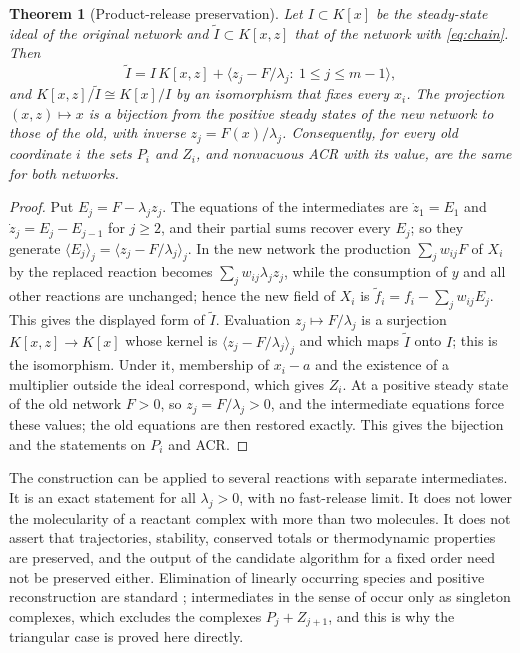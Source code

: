 \documentclass[11pt,a4paper]{article}
\theoremstyle{plain}
\newtheorem{theorem}{Theorem}[section]
\theoremstyle{definition}
\theoremstyle{remark}
\begin{document}
\begin{theorem}[Product-release preservation]\label{thm:release}
Let $I\subset K[x]$ be the steady-state ideal of the original network and $\tilde I\subset K[x,z]$ that of the network with \eqref{eq:chain}. Then
\[
  \tilde I=I\,K[x,z]+\bigl\langle z_j-F/\lambda_j:\ 1\le j\le m-1\bigr\rangle ,
\]
and $K[x,z]/\tilde I\cong K[x]/I$ by an isomorphism that fixes every $x_i$. The projection $(x,z)\mapsto x$ is a bijection from the positive steady states of the new network to those of the old, with inverse $z_j=F(x)/\lambda_j$. Consequently, for every old coordinate $i$ the sets $P_i$ and $Z_i$, and nonvacuous ACR with its value, are the same for both networks.
\end{theorem}
\begin{proof}
Put $E_j=F-\lambda_jz_j$. The equations of the intermediates are $\dot z_1=E_1$ and $\dot z_j=E_j-E_{j-1}$ for $j\ge2$, and their partial sums recover every $E_j$; so they generate $\langle E_j\rangle_j=\langle z_j-F/\lambda_j\rangle_j$. In the new network the production $\sum_jw_{ij}F$ of $X_i$ by the replaced reaction becomes $\sum_jw_{ij}\lambda_jz_j$, while the consumption of $y$ and all other reactions are unchanged; hence the new field of $X_i$ is $\tilde f_i=f_i-\sum_jw_{ij}E_j$. This gives the displayed form of $\tilde I$. Evaluation $z_j\mapsto F/\lambda_j$ is a surjection $K[x,z]\to K[x]$ whose kernel is $\langle z_j-F/\lambda_j\rangle_j$ and which maps $\tilde I$ onto $I$; this is the isomorphism. Under it, membership of $x_i-a$ and the existence of a multiplier outside the ideal correspond, which gives $Z_i$. At a positive steady state of the old network $F>0$, so $z_j=F/\lambda_j>0$, and the intermediate equations force these values; the old equations are then restored exactly. This gives the bijection and the statements on $P_i$ and ACR.
\end{proof}

The construction can be applied to several reactions with separate intermediates. It is an exact statement for all $\lambda_j>0$, with no fast-release limit. It does not lower the molecularity of a reactant complex with more than two molecules. It does not assert that trajectories, stability, conserved totals or thermodynamic properties are preserved, and the output of the candidate algorithm for a fixed order need not be preserved either. Elimination of linearly occurring species and positive reconstruction are standard \cite{fwlinear,fwptm}; intermediates in the sense of \cite{fwintermediate} occur only as singleton complexes, which excludes the complexes $P_j+Z_{j+1}$, and this is why the triangular case is proved here directly.
\end{document}
